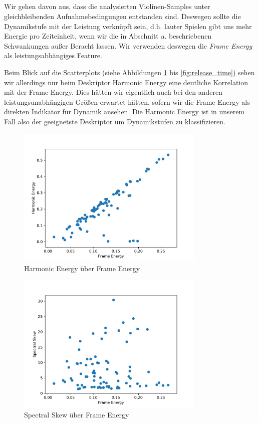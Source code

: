 \subsection{}
Wir gehen davon aus, dass die analysierten Violinen-Samples unter gleichbleibenden Aufnahmebedingungen entstanden sind. 
Deswegen sollte die Dynamikstufe mit der Leistung verknüpft sein, d.h. lauter Spielen gibt uns mehr Energie pro Zeiteinheit, wenn wir die in Abschnitt a. beschriebenen Schwankungen außer Beracht lassen.
Wir verwenden deswegen die \textit{Frame Energy} als leistungsabhängiges Feature.

Beim Blick auf die Scatterplots (siehe Abbildungen \ref{fig:harmonic_energy} bis \ref{fig:release_time}) sehen wir allerdings nur beim Deskriptor Harmonic Energy eine deutliche Korrelation mit der Frame Energy. 
Dies hätten wir eigentlich auch bei den anderen leistungsunabhängigen Größen erwartet hätten, sofern wir die Frame Energy als direkten Indikator für Dynamik ansehen.
Die Harmonic Energy ist in unserem Fall also der geeignetste Deskriptor um Dynamikstufen zu klassifizieren.

\begin{figure}[H]
    \center
    \includegraphics[width = 0.8\textwidth]{Figures/harmonicErg}
    \caption{Harmonic Energy über Frame Energy }
    \label{fig:harmonic_energy}
\end{figure}

\begin{figure}[H]
    \center
    \includegraphics[width = 0.8\textwidth]{Figures/specSkew.pdf}
    \caption{Spectral Skew über Frame Energy}
    \label{fig:spectral_skew}
\end{figure}

